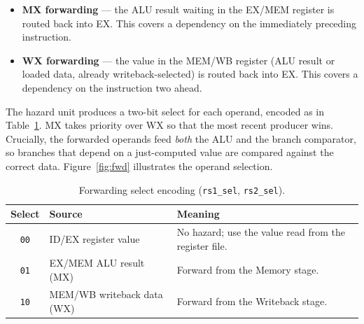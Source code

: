 \documentclass[11pt,a4paper]{article}
\newcommand{\sig}[1]{\texttt{#1}}
\begin{document}
\begin{itemize}[leftmargin=1.4cm]
  \item \textbf{MX forwarding} --- the ALU result waiting in the EX/MEM register is routed
    back into EX. This covers a dependency on the immediately preceding instruction.
  \item \textbf{WX forwarding} --- the value in the MEM/WB register (ALU result or loaded
    data, already writeback-selected) is routed back into EX. This covers a dependency on
    the instruction two ahead.
\end{itemize}

The hazard unit produces a two-bit select for each operand, encoded as in
Table~\ref{tab:fwdsel}. MX takes priority over WX so that the most recent producer wins.
Crucially, the forwarded operands feed \emph{both} the ALU and the branch comparator, so
branches that depend on a just-computed value are compared against the correct data.
Figure~\ref{fig:fwd} illustrates the operand selection.

\begin{table}[h]
\centering
\caption{Forwarding select encoding (\sig{rs1\_sel}, \sig{rs2\_sel}).}
\label{tab:fwdsel}
\small
\begin{tabular}{@{}c l l@{}}
\toprule
\textbf{Select} & \textbf{Source} & \textbf{Meaning} \\
\midrule
\sig{00} & ID/EX register value      & No hazard; use the value read from the register file. \\
\sig{01} & EX/MEM ALU result (MX)    & Forward from the Memory stage. \\
\sig{10} & MEM/WB writeback data (WX)& Forward from the Writeback stage. \\
\bottomrule
\end{tabular}
\end{table}
\end{document}
